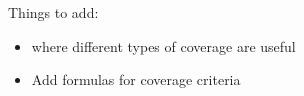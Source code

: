 Things to add:
\begin{itemize}
    \item where different types of coverage are useful
    \item Add formulas for coverage criteria
\end{itemize}